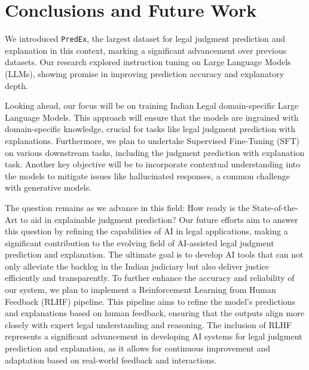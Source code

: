 \section{Conclusions and Future Work}
We introduced \texttt{PredEx}, the largest dataset for legal judgment prediction and explanation in this context, marking a significant advancement over previous datasets. Our research explored instruction tuning on Large Language Models (LLMs), showing promise in improving prediction accuracy and explanatory depth.

Looking ahead, our focus will be on training Indian Legal domain-specific Large Language Models. This approach will ensure that the models are ingrained with domain-specific knowledge, crucial for tasks like legal judgment prediction with explanations. Furthermore, we plan to undertake Supervised Fine-Tuning (SFT) on various downstream tasks, including the judgment prediction with explanation task. Another key objective will be to incorporate contextual understanding into the models to mitigate issues like hallucinated responses, a common challenge with generative models.

The question remains as we advance in this field: How ready is the State-of-the-Art to aid in explainable judgment prediction? Our future efforts aim to answer this question by refining the capabilities of AI in legal applications, making a significant contribution to the evolving field of AI-assisted legal judgment prediction and explanation. The ultimate goal is to develop AI tools that can not only alleviate the backlog in the Indian judiciary but also deliver justice efficiently and transparently. To further enhance the accuracy and reliability of our system, we plan to implement a Reinforcement Learning from Human Feedback (RLHF) pipeline. This pipeline aims to refine the model's predictions and explanations based on human feedback, ensuring that the outputs align more closely with expert legal understanding and reasoning. The inclusion of RLHF represents a significant advancement in developing AI systems for legal judgment prediction and explanation, as it allows for continuous improvement and adaptation based on real-world feedback and interactions.
